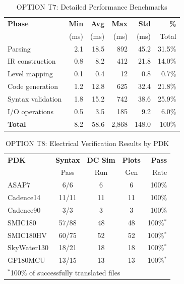 \documentclass[conference]{IEEEtran}
\begin{document}
\begin{table}[!t]
\caption{OPTION T7: Detailed Performance Benchmarks}
\label{tab:perf_detailed}
\centering
\renewcommand{\arraystretch}{1.2}
\begin{tabular}{@{}lrrrrr@{}}
\toprule
\textbf{Phase} & \textbf{Min} & \textbf{Avg} & \textbf{Max} & \textbf{Std} & \textbf{\%} \\
 & (ms) & (ms) & (ms) & (ms) & Total \\
\midrule
Parsing & 2.1 & 18.5 & 892 & 45.2 & 31.5\% \\
IR construction & 0.8 & 8.2 & 412 & 21.8 & 14.0\% \\
Level mapping & 0.1 & 0.4 & 12 & 0.8 & 0.7\% \\
Code generation & 1.2 & 12.8 & 625 & 32.4 & 21.8\% \\
Syntax validation & 1.8 & 15.2 & 742 & 38.6 & 25.9\% \\
I/O operations & 0.5 & 3.5 & 185 & 9.2 & 6.0\% \\
\midrule
\textbf{Total} & 8.2 & 58.6 & 2,868 & 148.0 & 100\% \\
\bottomrule
\end{tabular}
\end{table}

\begin{table}[!t]
\caption{OPTION T8: Electrical Verification Results by PDK}
\label{tab:verify_pdk}
\centering
\renewcommand{\arraystretch}{1.2}
\begin{tabular}{@{}lcccr@{}}
\toprule
\textbf{PDK} & \textbf{Syntax} & \textbf{DC Sim} & \textbf{Plots} & \textbf{Pass} \\
 & Pass & Run & Gen & Rate \\
\midrule
ASAP7 & 6/6 & 6 & 6 & 100\% \\
Cadence14 & 11/11 & 11 & 11 & 100\% \\
Cadence90 & 3/3 & 3 & 3 & 100\% \\
SMIC180 & 57/88 & 48 & 48 & 100\%$^*$ \\
SMIC180HV & 60/75 & 52 & 52 & 100\%$^*$ \\
SkyWater130 & 18/21 & 18 & 18 & 100\%$^*$ \\
GF180MCU & 13/15 & 13 & 13 & 100\%$^*$ \\
\midrule
\multicolumn{5}{l}{\footnotesize $^*$100\% of successfully translated files} \\
\bottomrule
\end{tabular}
\end{table}
\end{document}
